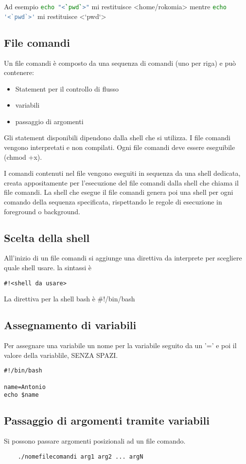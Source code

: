 \documentclass
[10pt,        %
 a4paper,     %
 onecolumn,   %
 fleqn,       %
 oneside,     %
 notitlepage, %
 openany      %
]{article}    %
\begin{document}
Ad esempio 
\lstinline[language=bash]!echo "<`pwd`>"! mi restituisce <home/rokomia> mentre
\lstinline[language=bash]!echo '<`pwd`>'! mi restituisce <`pwd`>

\subsection{File comandi}
Un file comandi è composto da una sequenza di comandi (uno per riga) e può contenere:
\begin{itemize}
    \item Statement per il controllo di flusso
    \item variabili
    \item passaggio di argomenti
\end{itemize}
Gli statement disponibili dipendono dalla shell che si utilizza. I file comandi vengono interpretati e non compilati. Ogni file comandi deve essere eseguibile (chmod +x).

I comandi contenuti nel file vengono eseguiti in sequenza da una shell dedicata, creata appositamente per l'esecuzione del file comandi dalla shell che chiama il file comandi. La shell che esegue il file comandi genera poi una shell per ogni comando della sequenza specificata, rispettando le regole di esecuzione in foreground o background.

\subsection{Scelta della shell}
All'inizio di un file comandi si aggiunge una direttiva da interprete per scegliere quale shell usare. la sintassi è
\begin{lstlisting}
#!<shell da usare>
\end{lstlisting}

La direttiva per la shell bash è \#!/bin/bash

\subsection{Assegnamento di variabili}
Per assegnare una variabile un nome per la variabile seguito da un '=' e poi il valore della variablile, SENZA SPAZI.

\begin{lstlisting}
#!/bin/bash

name=Antonio
echo $name
\end{lstlisting}

\subsection{Passaggio di argomenti tramite variabili}
Si possono passare argomenti posizionali ad un file comando.
\begin{lstlisting}
    ./nomefilecomandi arg1 arg2 ... argN
\end{lstlisting}
\end{document}
